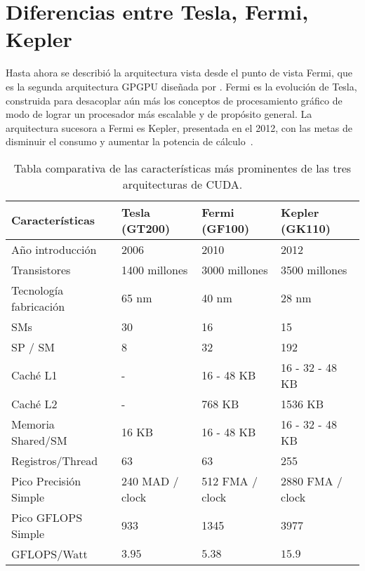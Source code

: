 \section{Diferencias entre Tesla, Fermi, Kepler}

Hasta ahora se describi\'o la arquitectura vista desde el punto de vista Fermi, que es la segunda arquitectura GPGPU dise\~nada por \nvidia{}.
Fermi es la evoluci\'on de Tesla, construida para desacoplar a\'un m\'as los conceptos de procesamiento gr\'afico de modo de lograr un procesador m\'as escalable y de prop\'osito general.
La arquitectura sucesora a Fermi es Kepler, presentada en el 2012, con las metas de disminuir el consumo y aumentar la potencia de c\'alculo~\cite{NvidiaKepler}.

\begin{table}[h]
  \begin{tabular}{@{}llll@{}}
  \toprule
  Caracter\'isticas        & Tesla (GT200)   & Fermi (GF100)   & Kepler (GK110)   \\ \midrule
  A\~no introducci\'on     & 2006            & 2010            & 2012             \\
  Transistores             & 1400 millones   & 3000 millones   & 3500 millones    \\
  Tecnolog\'ia fabricaci\'on & 65 nm           & 40 nm           & 28 nm            \\
  SMs                      & 30              & 16              & 15               \\
  SP / SM                  & 8               & 32              & 192              \\
  Cach\'e L1               & -               & 16 - 48 KB       & 16 - 32 - 48 KB   \\
  Cach\'e L2               & -               & 768 KB           & 1536 KB           \\
  Memoria Shared/SM      & 16 KB            & 16 - 48 KB       & 16 - 32 - 48 KB   \\
  Registros/Thread         & 63              & 63              & 255              \\
  Pico Precisi\'on Simple    & 240 MAD / clock & 512 FMA / clock & 2880 FMA / clock \\
  Pico GFLOPS Simple       & 933             & 1345            & 3977             \\
  GFLOPS/Watt              & $3.95$            & $5.38$            & $15.9$             \\ \bottomrule
  \end{tabular}
\caption{Tabla comparativa de las caracter\'isticas m\'as prominentes de las tres arquitecturas de CUDA.}
\label{tab:CudaGenerations}
\end{table}

